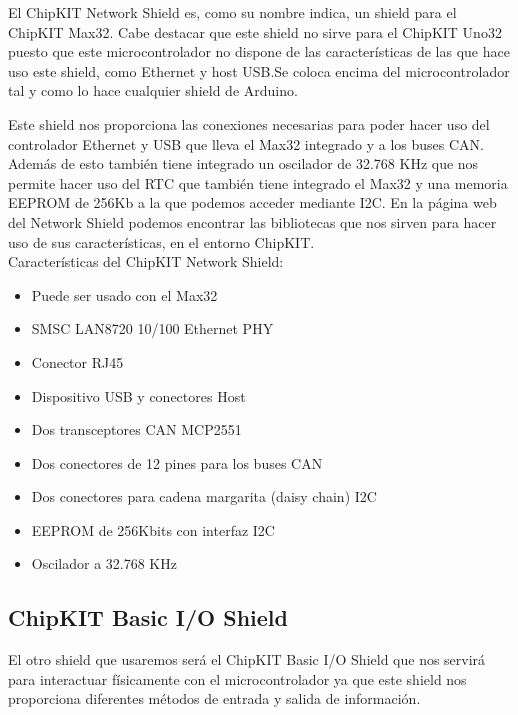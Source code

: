 El ChipKIT Network Shield es, como su nombre indica, un shield para el ChipKIT Max32. Cabe destacar que este shield no sirve para el ChipKIT Uno32 puesto que este microcontrolador no dispone de las características de las que hace uso este shield, como Ethernet y host USB.Se coloca encima del microcontrolador tal y como lo hace cualquier shield de Arduino.


Este shield nos proporciona las conexiones necesarias para poder hacer uso del controlador Ethernet y USB que lleva el Max32 integrado y a los buses CAN. Además de esto también tiene integrado un oscilador de 32.768 KHz que nos permite hacer uso del RTC que también tiene integrado el Max32 y una memoria EEPROM de 256Kb a la que podemos acceder mediante I2C. En la página web del Network Shield\cite{website:network_shield} podemos encontrar las bibliotecas que nos sirven para hacer uso de sus características, en el entorno ChipKIT.\\

Características del ChipKIT Network Shield:
\begin{itemize}
	\item Puede ser usado con el Max32
	\item SMSC LAN8720 10/100 Ethernet PHY
	\item Conector RJ45
	\item Dispositivo USB y conectores Host
	\item Dos transceptores CAN MCP2551
	\item Dos conectores de 12 pines para los buses CAN
	\item Dos conectores para cadena margarita (daisy chain) I2C
	\item EEPROM de 256Kbits con interfaz I2C
	\item Oscilador a 32.768 KHz
\end{itemize}

\newpage


\subsection{ChipKIT Basic I/O Shield}
El otro shield que usaremos será el ChipKIT Basic I/O Shield que nos servirá para interactuar físicamente con el microcontrolador ya que este shield nos proporciona diferentes métodos de entrada y salida de información.


